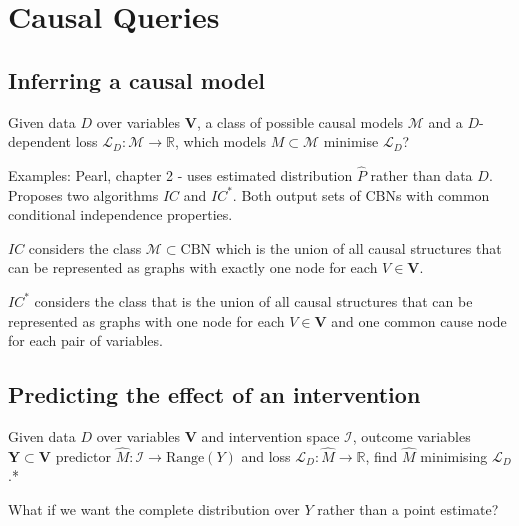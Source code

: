 \section{Causal Queries}

\subsection{Inferring a causal model}

Given data $D$ over variables $\mathbf{V}$, a class of possible causal models $\mathcal{M}$ and a $D$-dependent loss $\mathcal{L}_D:\mathcal{M}\to \mathbb{R}$, which models $M\subset \mathcal{M}$ minimise $\mathcal{L}_D$?

Examples: Pearl, chapter 2 \cite{pearl_causality:_2009} - uses estimated distribution $\hat{P}$ rather than data $D$. Proposes two algorithms $IC$ and $IC^*$. Both output sets of CBNs with common conditional independence properties.

$IC$ considers the class $\mathcal{M}\subset\text{CBN}$ which is the union of all causal structures that can be represented as graphs with exactly one node for each $V\in\mathbf{V}$.

$IC^*$ considers the class that is the union of all causal structures that can be represented as graphs with one node for each $V\in\mathbf{V}$ and one common cause node for each pair of variables.


\subsection{Predicting the effect of an intervention}

Given data $D$ over variables $\mathbf{V}$ and intervention space $\mathcal{I}$, outcome variables $\mathbf{Y}\subset\mathbf{V}$ predictor $\hat{M}:\mathcal{I}\to\text{Range}(Y)$ and loss $\mathcal{L}_D:\hat{M}\to\mathbb{R}$, find $\hat{M}$ minimising $\mathcal{L}_D$.*

What if we want the complete distribution over $Y$ rather than a point estimate?